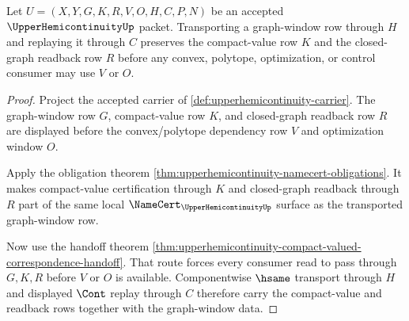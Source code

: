 \begin{theorem}
\label{thm:upperhemicontinuity-graph-window-compact-value-stability}
Let $U=(X,Y,G,K,R,V,O,H,C,P,N)$ be an accepted $\UpperHemicontinuityUp$ packet. Transporting a graph-window row through $H$ and replaying it through $C$ preserves the compact-value row $K$ and the closed-graph readback row $R$ before any convex, polytope, optimization, or control consumer may use $V$ or $O$.
\end{theorem}
\begin{proof}
Project the accepted carrier of \autoref{def:upperhemicontinuity-carrier}. The graph-window row $G$, compact-value row $K$, and closed-graph readback row $R$ are displayed before the convex/polytope dependency row $V$ and optimization window $O$.

Apply the obligation theorem \autoref{thm:upperhemicontinuity-namecert-obligations}. It makes compact-value certification through $K$ and closed-graph readback through $R$ part of the same local $\NameCert_{\UpperHemicontinuityUp}$ surface as the transported graph-window row.

Now use the handoff theorem \autoref{thm:upperhemicontinuity-compact-valued-correspondence-handoff}. That route forces every consumer read to pass through $G,K,R$ before $V$ or $O$ is available. Componentwise $\hsame$ transport through $H$ and displayed $\Cont$ replay through $C$ therefore carry the compact-value and readback rows together with the graph-window data.
\end{proof}





